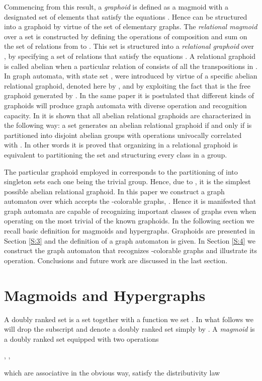 \documentclass[runningheads,a4paper]{llncs}
\begin{document}
Commencing from this result, a \emph{graphoid}  is defined as a magmoid with a designated set of elements that satisfy the equations . Hence  can be structured into a graphoid by virtue of the set  of elementary graphs. The \emph{relational magmoid} over a set  is constructed by defining the operations of composition and sum on the set of relations from  to . This set is structured into a \emph{relational graphoid} over , by specifying a set  of relations that satisfy the equations . A relational graphoid is called abelian when a particular relation of  consists of all the transpositions in .
In \cite{BK3} graph automata, with state set , were introduced by virtue of a specific abelian relational graphoid, denoted here by , and by exploiting the fact that  is the free graphoid generated by . In the same paper it is postulated that different kinds of graphoids will produce graph automata with diverse operation and recognition capacity. In \cite{Kal2} it is shown that all abelian relational graphoids are characterized in the following way: a set  generates an abelian relational graphoid if and only if  is partitioned  into  disjoint abelian groups with operations univocally correlated with . In other words it is proved that organizing  in a relational graphoid is equivalent to partitioning the set  and structuring every class in a group.

The particular graphoid  employed in \cite{BK3} corresponds to the partitioning of  into singleton sets each one being the trivial group. Hence, due to \cite{Kal2}, it is the simplest possible abelian relational graphoid. In this paper we construct a graph automaton over  which accepts the -colorable graphs, . Hence it is manifested that graph automata are capable of recognizing important classes of graphs even when operating on the most trivial of the known graphoids. In the following section we recall basic definition for magmoids and hypergraphs. Graphoids are presented in Section \ref{S:3} and the definition of a graph automaton is given. In Section \ref{S:4} we construct the graph automaton that recognizes -colorable graphs and illustrate its operation. Conclusions and future work are discussed in the last section.


\section{Magmoids and Hypergraphs}

A doubly ranked set   is a set  together with a function  we set . In what follows we will drop the subscript   and denote a doubly ranked set simply by .
A \emph{magmoid} is a doubly ranked set 
equipped with two operations
\begin{center}
,
\quad
,
\end{center}
which are associative in the obvious way, satisfy the
distributivity law
\end{document}
